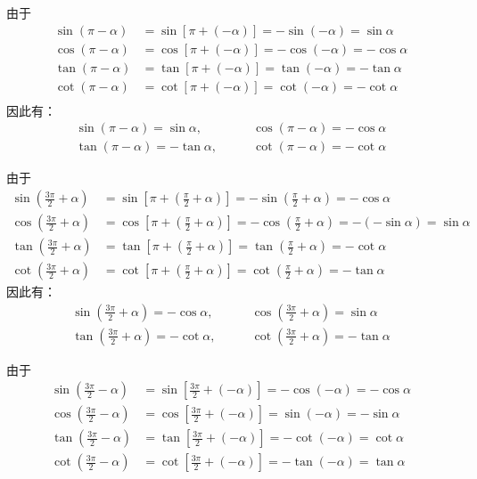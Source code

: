 由于
\[\begin{split}
\sin(\pi-\alpha)&=\sin[\pi+(-\alpha)]= -\sin(-\alpha)=\sin\alpha\\
\cos(\pi-\alpha)&=\cos[\pi+(-\alpha)]= -\cos(-\alpha)=-\cos\alpha\\
\tan(\pi-\alpha)&=\tan[\pi+(-\alpha)]= \tan(-\alpha)=-\tan\alpha\\
\cot(\pi-\alpha)&=\cot[\pi+(-\alpha)]= \cot(-\alpha)=-\cot\alpha\\
\end{split}\]
因此有：
\begin{equation}
    \begin{split}
        \sin\left(\pi-\alpha\right)=\sin\alpha, &\qquad \cos\left(\pi-\alpha\right)=-\cos\alpha \\
        \tan\left(\pi-\alpha\right)=-\tan\alpha, &\qquad \cot\left(\pi-\alpha\right)=-\cot\alpha 
    \end{split}    
    \end{equation}

由于
\[\begin{split}
\sin\left(\frac{3\pi}{2}+\alpha\right)&=\sin \left[\pi+\left(\frac{\pi}{2}+\alpha\right)\right]=-\sin\left(\frac{\pi}{2}+\alpha\right)=-\cos\alpha\\
\cos\left(\frac{3\pi}{2}+\alpha\right)&=\cos \left[\pi+\left(\frac{\pi}{2}+\alpha\right)\right]=-\cos\left(\frac{\pi}{2}+\alpha\right)=-(-\sin\alpha)=\sin\alpha\\
\tan\left(\frac{3\pi}{2}+\alpha\right)&=\tan \left[\pi+\left(\frac{\pi}{2}+\alpha\right)\right]=\tan\left(\frac{\pi}{2}+\alpha\right)=-\cot\alpha\\
\cot\left(\frac{3\pi}{2}+\alpha\right)&=\cot \left[\pi+\left(\frac{\pi}{2}+\alpha\right)\right]=\cot\left(\frac{\pi}{2}+\alpha\right)=-\tan\alpha
\end{split}\]
因此有：
\begin{equation}
    \begin{split}
        \sin\left(\frac{3\pi}{2}+\alpha\right)=-\cos\alpha, &\qquad \cos\left(\frac{3\pi}{2}+\alpha\right)=\sin\alpha \\
        \tan\left(\frac{3\pi}{2}+\alpha\right)=-\cot\alpha, &\qquad \cot\left(\frac{3\pi}{2}+\alpha\right)=-\tan\alpha 
    \end{split}    
    \end{equation}

由于
\[\begin{split}
\sin\left(\frac{3\pi}{2}-\alpha\right)&=\sin\left[\frac{3\pi}{2}+(-\alpha)\right]=-\cos(-\alpha)=-\cos\alpha\\
\cos\left(\frac{3\pi}{2}-\alpha\right)&=\cos \left[\frac{3\pi}{2}+(-\alpha)\right]=\sin(-\alpha)=-\sin\alpha\\
\tan\left(\frac{3\pi}{2}-\alpha\right)&=\tan \left[\frac{3\pi}{2}+(-\alpha)\right]=-\cot(-\alpha)=\cot\alpha\\
\cot\left(\frac{3\pi}{2}-\alpha\right)&=\cot \left[\frac{3\pi}{2}+(-\alpha)\right]=-\tan(-\alpha)=\tan\alpha
\end{split}\]

